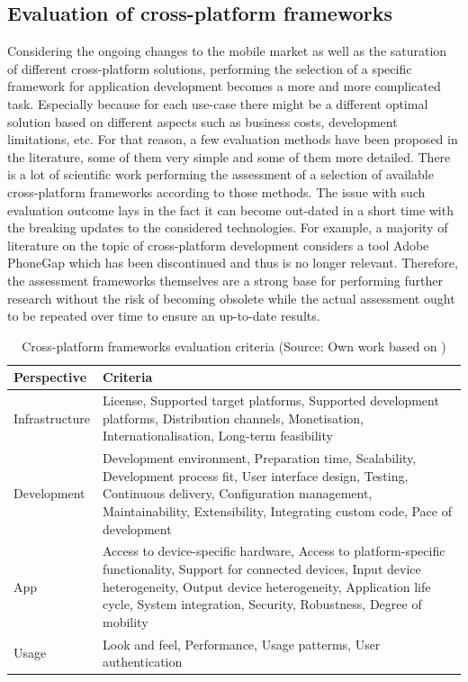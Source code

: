 \subsection{Evaluation of cross-platform frameworks}

Considering the ongoing changes to the mobile market as well as the saturation of different cross-platform solutions, performing the selection of a specific framework for application development becomes a more and more complicated task. Especially because for each use-case there might be a different optimal solution based on different aspects such as business costs, development limitations, etc. For that reason, a few evaluation methods have been proposed in the literature, some of them very simple and some of them more detailed. There is a lot of scientific work performing the assessment of a selection of available cross-platform frameworks according to those methods. The issue with such evaluation outcome lays in the fact it can become out-dated in a short time with the breaking updates to the considered technologies. For example, a majority of literature on the topic of cross-platform development considers a tool Adobe PhoneGap which has been discontinued and thus is no longer relevant. Therefore, the assessment frameworks themselves are a strong base for performing further research  without the risk of becoming obsolete while the actual assessment ought to be repeated over time to ensure an up-to-date results.

\begin{table}[h]
	\centering
    \caption{Cross-platform frameworks evaluation criteria (Source: Own work based on \cite{rieger_eval_cp})}
    \label{tab:eval_criteria}
	\begin{tabular}{ |l|p{}| }
		\hline
        Perspective&Criteria\\
		\hline
		Infrastructure&License, Supported target platforms, Supported development platforms, Distribution channels, Monetisation, Internationalisation, Long-term feasibility\\
		\hline
		Development&Development environment, Preparation time, Scalability, Development process fit, User interface design, Testing, Continuous delivery, Configuration management, Maintainability, Extensibility, Integrating custom code, Pace of development\\
		\hline
		App&Access to device-specific hardware, Access to platform-specific functionality, Support for connected devices, Input device heterogeneity, Output device heterogeneity, Application life cycle, System integration, Security, Robustness, Degree of mobility\\
		\hline
		Usage&Look and feel, Performance, Usage patterms, User authentication\\
		\hline
	\end{tabular}
\end{table}

